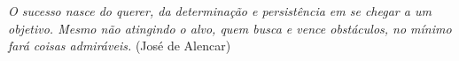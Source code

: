 \begin{epigrafe}
\textit{O sucesso nasce do querer, da determinação e persistência em se chegar a um objetivo. Mesmo não atingindo o alvo, quem busca e vence obstáculos, no mínimo fará coisas admiráveis.}
(José de  Alencar)
\end{epigrafe}